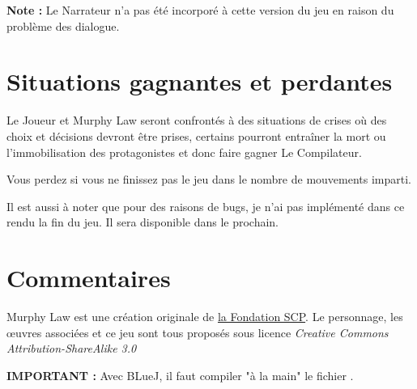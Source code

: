 \textbf{Note :} Le Narrateur n'a pas été incorporé à cette version du jeu en raison du problème des dialogue.

\section{Situations gagnantes et perdantes}

Le Joueur et Murphy Law seront confrontés à des situations de crises où des choix et décisions devront être prises, certains pourront entraîner la mort ou l'immobilisation des protagonistes et donc faire gagner Le Compilateur.

Vous perdez si vous ne finissez pas le jeu dans le nombre de mouvements imparti.

Il est aussi à noter que pour des raisons de bugs, je n'ai pas implémenté dans ce rendu la fin du jeu. Il sera disponible dans le prochain.

\section{Commentaires}

Murphy Law est une création originale de \href{http://scp-wiki.wikidot.com/murphy-law-hub}{la Fondation SCP}. Le personnage, les œuvres associées et ce jeu sont tous proposés sous licence \emph{Creative Commons Attribution-ShareAlike 3.0}

\textbf{IMPORTANT :} Avec BLueJ, il faut compiler "à la main" le fichier .
 
